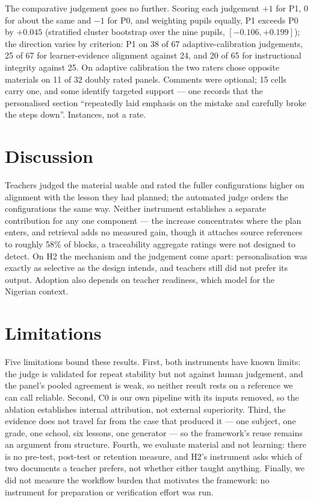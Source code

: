 \documentclass{article}
\begin{document}
The comparative judgement goes no further. Scoring each judgement $+1$ for P1, $0$ for about the
same and $-1$ for P0, and weighting pupils equally, P1 exceeds P0 by $+0.045$ (stratified
cluster bootstrap over the nine pupils, $[-0.106,+0.199]$); the direction varies by criterion: P1 on 38 of 67 adaptive-calibration judgements, 25 of 67 for learner-evidence alignment against 24, and 20 of
65 for instructional integrity against 25. On adaptive calibration the two raters chose
opposite materials on 11 of 32 doubly rated panels. Comments were optional; 15 cells carry one, and
some identify targeted support --- one records that the personalised section ``repeatedly laid
emphasis on the mistake and carefully broke the steps down''. Instances, not a rate.

\section{Discussion}

Teachers judged the material usable and rated the fuller configurations higher on alignment
with the lesson they had planned; the automated judge orders the configurations the same way.
Neither instrument establishes a separate contribution for any one component --- the increase
concentrates where the plan enters, and retrieval adds no measured gain, though it attaches
source references to roughly 58\% of blocks, a traceability aggregate ratings were not designed
to detect. On H2 the mechanism and the judgement come apart: personalisation was exactly as
selective as the design intends, and teachers still did not prefer its output. Adoption also
depends on teacher readiness, which \citet{ayanwale2025} model for the Nigerian context.

\section{Limitations}

Five limitations bound these results. First, both instruments have known limits: the judge is
validated for repeat stability but not against human judgement, and the panel's pooled agreement is
weak, so neither result rests on a reference we can call reliable.
Second, C0 is our own pipeline with its inputs removed, so the ablation establishes internal
attribution, not external superiority. Third, the evidence does not travel far from the case
that produced it --- one subject, one grade, one school, six lessons, one generator --- so the
framework's reuse remains an argument from structure. Fourth, we evaluate material and not
learning: there is no pre-test, post-test or retention measure, and H2's instrument asks which
of two documents a teacher prefers, not whether either taught anything.
Finally, we did not measure the workflow burden that motivates the framework: no instrument for
preparation or verification effort was run.
\end{document}
